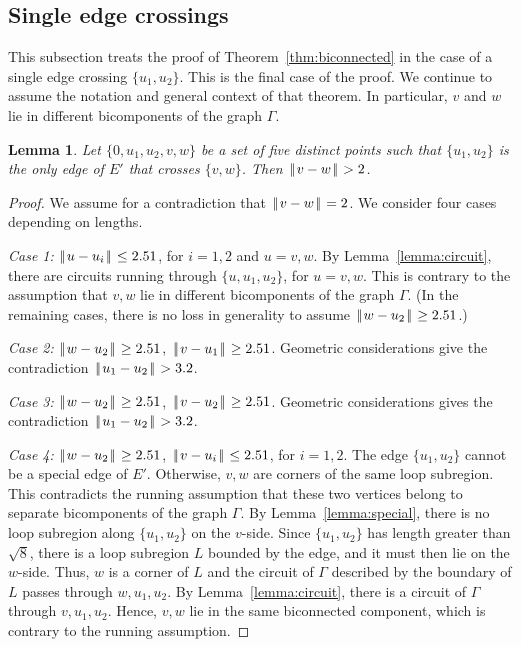 \documentclass[11pt]{amsart}
\def\|{{\hskip0.1em|\hskip-0.15em|\hskip0.1em}}
\newtheorem{lemma}{Lemma}
\begin{document}
\subsection*{Single edge crossings}

This subsection treats the proof of Theorem~\ref{thm:biconnected}
in the case of a single edge crossing $\{u_1,u_2\}$.  This is
the final case of the proof.
We continue to assume the notation and general context of that theorem.
In particular,  $v$ and $w$ lie in different bicomponents of
the graph $\Gamma$.

\begin{lemma}  Let $\{0,u_1,u_2,v,w\}$ be a set of five distinct
points such that $\{u_1,u_2\}$ is the only edge of $E'$ that
crosses $\{v,w\}$.  Then $\|v-w\|>2$.
\end{lemma}

\begin{proof} We assume for a contradiction that $\|v-w\|=2$.
We consider four cases depending on lengths.  

{\it Case 1:} $\|u-u_i\|\le 2.51$, for $i=1,2$ and $u=v,w$.
By Lemma~\ref{lemma:circuit}, there are circuits running through
$\{u,u_1,u_2\}$, for $u=v,w$.  This is contrary to the assumption
that $v,w$ lie in different bicomponents of the graph $\Gamma$.  (In the remaining cases, there is
no loss in generality to assume $\|w-u_2\|\ge 2.51$.)

{\it Case 2:} $\|w-u_2\|\ge 2.51$, $\|v-u_1\|\ge 2.51$.
Geometric considerations give the contradiction
$\|u_1-u_2\|>3.2$.

{\it Case 3:} $\|w-u_2\|\ge 2.51$, $\|v-u_2\|\ge 2.51$.
Geometric considerations gives the contradiction
$\|u_1-u_2\|>3.2$.

{\it Case 4:} $\|w-u_2\|\ge 2.51$, $\|v-u_i\|\le 2.51$, for $i=1,2$.
The edge $\{u_1,u_2\}$ cannot be a special edge of $E'$.  Otherwise,
$v,w$ are corners of the same loop subregion.  This contradicts
the running assumption that these two vertices belong to separate
bicomponents of the graph $\Gamma$.  By Lemma~\ref{lemma:special}, there is no loop subregion along $\{u_1,u_2\}$ on the $v$-side.
Since $\{u_1,u_2\}$ has length greater than $\sqrt8$, there
is a loop subregion $L$ bounded by the edge, and it must then lie
on the $w$-side.  Thus, $w$ is a corner of $L$ and the circuit of
$\Gamma$ described by the boundary of $L$ passes through $w,u_1,u_2$.
By Lemma~\ref{lemma:circuit}, there is a circuit of $\Gamma$ through
$v,u_1,u_2$.  Hence, $v,w$ lie in the same biconnected component,
which is contrary to the running assumption.
\end{proof}
\end{document}
